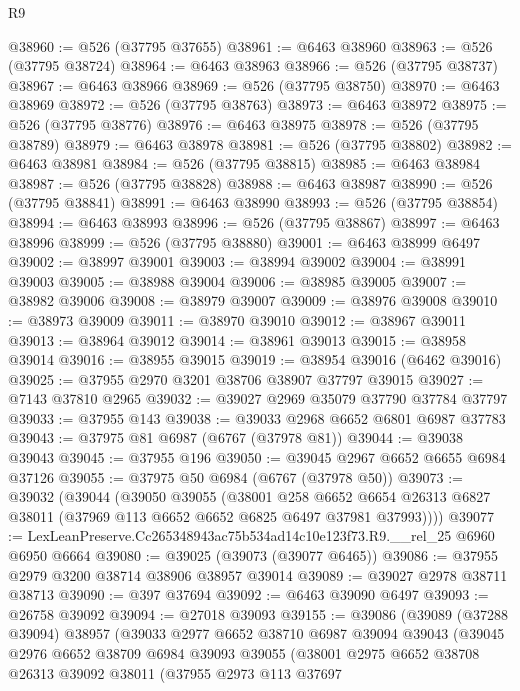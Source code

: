 \begin{lexlean}{R9}
\begin{coremodule}
@38960 := @526 (@37795 @37655)
@38961 := @6463 @38960
@38963 := @526 (@37795 @38724)
@38964 := @6463 @38963
@38966 := @526 (@37795 @38737)
@38967 := @6463 @38966
@38969 := @526 (@37795 @38750)
@38970 := @6463 @38969
@38972 := @526 (@37795 @38763)
@38973 := @6463 @38972
@38975 := @526 (@37795 @38776)
@38976 := @6463 @38975
@38978 := @526 (@37795 @38789)
@38979 := @6463 @38978
@38981 := @526 (@37795 @38802)
@38982 := @6463 @38981
@38984 := @526 (@37795 @38815)
@38985 := @6463 @38984
@38987 := @526 (@37795 @38828)
@38988 := @6463 @38987
@38990 := @526 (@37795 @38841)
@38991 := @6463 @38990
@38993 := @526 (@37795 @38854)
@38994 := @6463 @38993
@38996 := @526 (@37795 @38867)
@38997 := @6463 @38996
@38999 := @526 (@37795 @38880)
@39001 := @6463 @38999 @6497
@39002 := @38997 @39001
@39003 := @38994 @39002
@39004 := @38991 @39003
@39005 := @38988 @39004
@39006 := @38985 @39005
@39007 := @38982 @39006
@39008 := @38979 @39007
@39009 := @38976 @39008
@39010 := @38973 @39009
@39011 := @38970 @39010
@39012 := @38967 @39011
@39013 := @38964 @39012
@39014 := @38961 @39013
@39015 := @38958 @39014
@39016 := @38955 @39015
@39019 := @38954 @39016 (@6462 @39016)
@39025 := @37955 @2970 @3201 @38706 @38907 @37797 @39015
@39027 := @7143 @37810 @2965
@39032 := @39027 @2969 @35079 @37790 @37784 @37797
@39033 := @37955 @143
@39038 := @39033 @2968 @6652 @6801 @6987 @37783
@39043 := @37975 @81 @6987 (@6767 (@37978 @81))
@39044 := @39038 @39043
@39045 := @37955 @196
@39050 := @39045 @2967 @6652 @6655 @6984 @37126
@39055 := @37975 @50 @6984 (@6767 (@37978 @50))
@39073 := @39032
    (@39044
      (@39050
        @39055
        (@38001
          @258
          @6652
          @6654
          @26313
          @6827
          @38011
          (@37969 @113 @6652 @6652 @6825 @6497 @37981 @37993))))
@39077 := LexLeanPreserve.Cc265348943ac75b534ad14c10e123f73.R9.__rel_25 @6960 @6950 @6664
@39080 := @39025 (@39073 (@39077 @6465))
@39086 := @37955 @2979 @3200 @38714 @38906 @38957 @39014
@39089 := @39027 @2978 @38711 @38713
@39090 := @397 @37694
@39092 := @6463 @39090 @6497
@39093 := @26758 @39092
@39094 := @27018 @39093
@39155 := @39086
    (@39089
      (@37288 @39094)
      @38957
      (@39033
        @2977
        @6652
        @38710
        @6987
        @39094
        @39043
        (@39045
          @2976
          @6652
          @38709
          @6984
          @39093
          @39055
          (@38001
            @2975
            @6652
            @38708
            @26313
            @39092
            @38011
            (@37955
              @2973
              @113
              @37697

\end{coremodule}
\end{lexlean}

